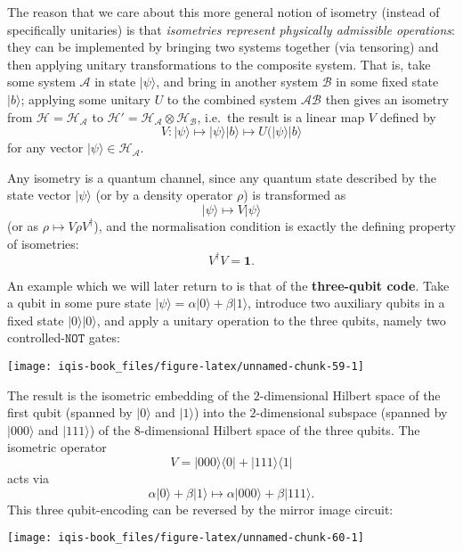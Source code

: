 \documentclass[fleqn]{article}
\begin{document}
The reason that we care about this more general notion of isometry (instead of specifically unitaries) is that \emph{isometries represent physically admissible operations}: they can be implemented by bringing two systems together (via tensoring) and then applying unitary transformations to the composite system.
That is, take some system \(\mathcal{A}\) in state \(|\psi\rangle\), and bring in another system \(\mathcal{B}\) in some fixed state \(|b\rangle\);
applying some unitary \(U\) to the combined system \(\mathcal{A}\mathcal{B}\) then gives an isometry from \(\mathcal{H}=\mathcal{H}_\mathcal{A}\) to \(\mathcal{H}'=\mathcal{H}_\mathcal{A}\otimes\mathcal{H}_\mathcal{B}\), i.e.~the result is a linear map \(V\) defined by
\[
  V\colon
  |\psi\rangle
  \longmapsto
  |\psi\rangle|b\rangle
  \longmapsto
  U(|\psi\rangle|b\rangle
\]
for any vector \(|\psi\rangle\in\mathcal{H}_\mathcal{A}\).

Any isometry is a quantum channel, since any quantum state described by the state vector \(|\psi\rangle\) (or by a density operator \(\rho\)) is transformed as
\[
  |\psi\rangle\longmapsto V|\psi\rangle
\]
(or as \(\rho\mapsto V\rho V^\dagger\)), and the normalisation condition is exactly the defining property of isometries:
\[
  V^\dagger V =\mathbf{1}.
\]

An example which we will later return to is that of the \textbf{three-qubit code}.
Take a qubit in some pure state \(|\psi\rangle=\alpha|0\rangle+\beta|1\rangle\), introduce two auxiliary qubits in a fixed state \(|0\rangle|0\rangle\), and apply a unitary operation to the three qubits, namely two controlled-\(\texttt{NOT}\) gates:

\begin{center}\texttt{[image: iqis-book\_files/figure-latex/unnamed-chunk-59-1]} \end{center}

The result is the isometric embedding of the \(2\)-dimensional Hilbert space of the first qubit (spanned by \(|0\rangle\) and \(|1\rangle\)) into the \(2\)-dimensional subspace (spanned by \(|000\rangle\) and \(|111\rangle\)) of the \(8\)-dimensional Hilbert space of the three qubits.
The isometric operator
\[
  V = |000\rangle\langle 0| + |111\rangle\langle 1|
\]
acts via
\[
  \alpha|0\rangle+\beta|1\rangle
  \longmapsto \alpha|000\rangle+\beta|111\rangle.
\]
This three qubit-encoding can be reversed by the mirror image circuit:

\begin{center}\texttt{[image: iqis-book\_files/figure-latex/unnamed-chunk-60-1]} \end{center}
\end{document}
